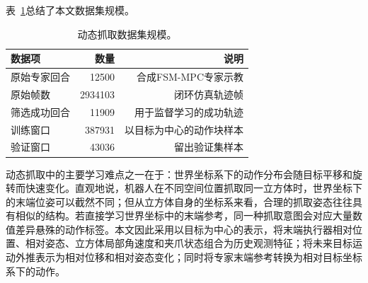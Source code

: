 表~\ref{tab:dataset-summary}总结了本文数据集规模。

\begin{table}[!htbp]
    \caption{动态抓取数据集规模。}
    \label{tab:dataset-summary}
    \centering
    \small
    \begin{tabular}{lrr}
        \hline
        数据项 & 数量 & 说明 \\
        \hline
        原始专家回合 & 12500 & 合成FSM-MPC专家示教 \\
        原始帧数 & 2934103 & 闭环仿真轨迹帧 \\
        筛选成功回合 & 11909 & 用于监督学习的成功轨迹 \\
        训练窗口 & 387931 & 以目标为中心的动作块样本 \\
        验证窗口 & 43036 & 留出验证集样本 \\
        \hline
    \end{tabular}
\end{table}

动态抓取中的主要学习难点之一在于：世界坐标系下的动作分布会随目标平移和旋转而快速变化。直观地说，机器人在不同空间位置抓取同一立方体时，世界坐标下的末端位姿可以截然不同；但从立方体自身的坐标系来看，合理的抓取姿态往往具有相似的结构。若直接学习世界坐标中的末端参考，同一种抓取意图会对应大量数值差异悬殊的动作标签。本文因此采用以目标为中心的表示，将末端执行器相对位置、相对姿态、立方体局部角速度和夹爪状态组合为历史观测特征；将未来目标运动外推表示为相对位移和相对姿态变化；同时将专家末端参考转换为相对目标坐标系下的动作。


